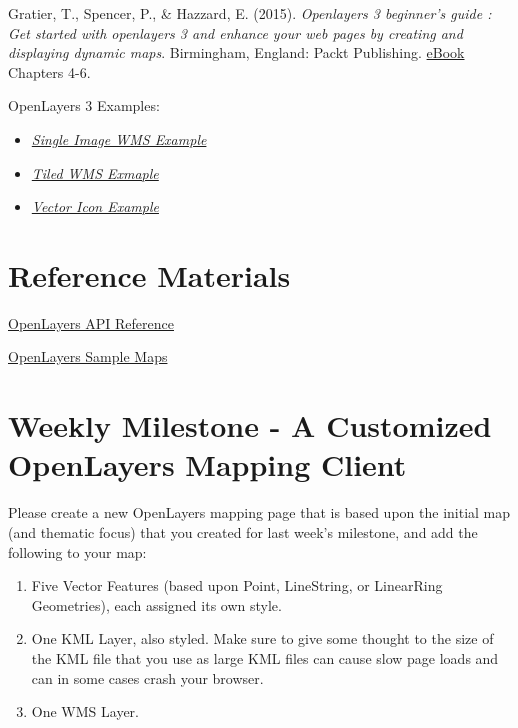 \documentclass[]{book}
\providecommand{\tightlist}{%
  \setlength{\itemsep}{0pt}\setlength{\parskip}{0pt}}
\begin{document}
Gratier, T., Spencer, P., \& Hazzard, E. (2015). \emph{Openlayers 3
beginner's guide : Get started with openlayers 3 and enhance your web
pages by creating and displaying dynamic maps}. Birmingham, England:
Packt Publishing.
\href{https://unm-on-worldcat-org.libproxy.unm.edu/oclc/903963849?databaseList=1271,143,1487,1533,1540,1672,1708,173,1925,2006,2007,203,2201,2237,2259,2260,2261,2262,2263,2264,2267,2268,2281,2328,3036,3201,638}{eBook}
Chapters 4-6.

OpenLayers 3 Examples:

\begin{itemize}
\tightlist
\item
  \href{http://openlayers.org/en/v3.2.1/examples/wms-image.html?q=wms}{\emph{Single
  Image WMS Example}}
\item
  \href{http://openlayers.org/en/v3.2.1/examples/wms-tiled.html?q=wms}{\emph{Tiled
  WMS Exmaple}}
\item
  \href{http://openlayers.org/en/v3.2.1/examples/icon.js}{\emph{Vector
  Icon Example}}
\end{itemize}

\section{Reference Materials}\label{week11-reference}

\href{http://openlayers.org/en/v3.14.2/apidoc/}{OpenLayers API
Reference}

\href{http://openlayers.org/en/v3.2.1/examples/}{OpenLayers Sample Maps}

\section{Weekly Milestone - A Customized OpenLayers Mapping
Client}\label{week11-milestone}

Please create a new OpenLayers mapping page that is based upon the
initial map (and thematic focus) that you created for last week's
milestone, and add the following to your map:

\begin{enumerate}
\def\labelenumi{\arabic{enumi}.}
\item
  Five Vector Features (based upon Point, LineString, or LinearRing
  Geometries), each assigned its own style.
\item
  One KML Layer, also styled. Make sure to give some thought to the size
  of the KML file that you use as large KML files can cause slow page
  loads and can in some cases crash your browser.
\item
  One WMS Layer.
\end{enumerate}
\end{document}
